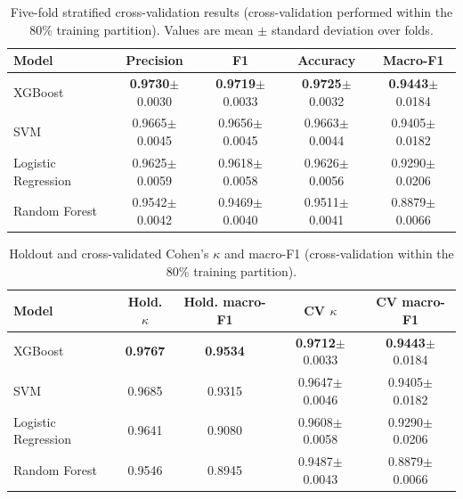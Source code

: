 

\begin{table}[htbp]
\caption{Five-fold stratified cross-validation results (cross-validation performed
within the 80\% training partition). Values are mean $\pm$ standard deviation over folds.}
\label{tab:cv}
\centering
\footnotesize
\begin{tabular}{lcccc}
\toprule
Model & Precision & F1 & Accuracy & Macro-F1 \\
\midrule
XGBoost & \textbf{0.9730}$\pm$0.0030 & \textbf{0.9719}$\pm$0.0033 & \textbf{0.9725}$\pm$0.0032 & \textbf{0.9443}$\pm$0.0184 \\
SVM & 0.9665$\pm$0.0045 & 0.9656$\pm$0.0045 & 0.9663$\pm$0.0044 & 0.9405$\pm$0.0182 \\
Logistic Regression & 0.9625$\pm$0.0059 & 0.9618$\pm$0.0058 & 0.9626$\pm$0.0056 & 0.9290$\pm$0.0206 \\
Random Forest & 0.9542$\pm$0.0042 & 0.9469$\pm$0.0040 & 0.9511$\pm$0.0041 & 0.8879$\pm$0.0066 \\
\bottomrule
\end{tabular}
\end{table}


\begin{table}[htbp]
\caption{Holdout and cross-validated Cohen's $\kappa$ and macro-F1
(cross-validation within the 80\% training partition).}
\label{tab:kappa}
\centering
\footnotesize
\begin{tabular}{lcccc}
\toprule
Model & Hold. $\kappa$ & Hold. macro-F1 & CV $\kappa$ & CV macro-F1 \\
\midrule
XGBoost & \textbf{0.9767} & \textbf{0.9534} & \textbf{0.9712}$\pm$0.0033 & \textbf{0.9443}$\pm$0.0184 \\
SVM & 0.9685 & 0.9315 & 0.9647$\pm$0.0046 & 0.9405$\pm$0.0182 \\
Logistic Regression & 0.9641 & 0.9080 & 0.9608$\pm$0.0058 & 0.9290$\pm$0.0206 \\
Random Forest & 0.9546 & 0.8945 & 0.9487$\pm$0.0043 & 0.8879$\pm$0.0066 \\
\bottomrule
\end{tabular}
\end{table}


